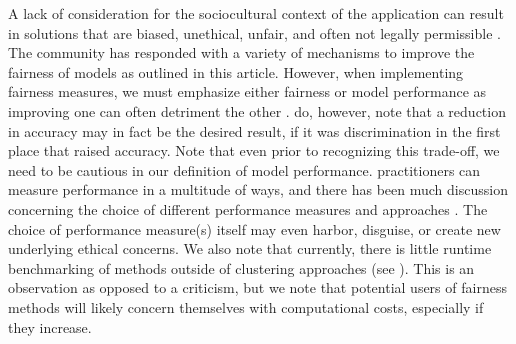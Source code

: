 \label{sec:tradeoff}
A lack of consideration for the sociocultural context of the application can result in \ml solutions that are biased, unethical, unfair, and often not legally permissible . The \ml community has responded with a variety of mechanisms to improve the fairness of models as outlined in this article. However, when implementing fairness measures, we must emphasize either fairness or model performance as improving one can often detriment the other .  do, however, note that a reduction in accuracy may in fact be the desired result, if it was discrimination in the first place that raised accuracy. Note that even prior to recognizing this trade-off, we need to be cautious in our definition of model performance. \ml practitioners can measure performance in a multitude of ways, and there has been much discussion concerning the choice of different performance measures and approaches . The choice of performance measure(s) itself may even harbor, disguise, or create new underlying ethical concerns. We also note that currently, there is little runtime benchmarking of methods outside of clustering approaches (see ). This is an observation as opposed to a criticism, but we note that potential users of fairness methods will likely concern themselves with computational costs, especially if they increase.

